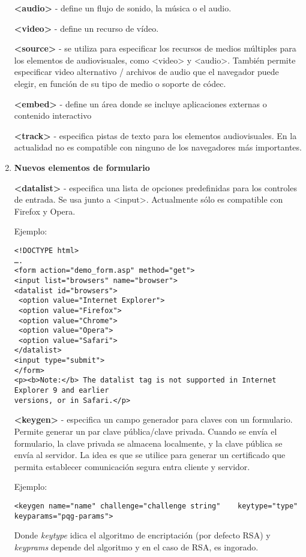 \documentclass{apuntes}
\begin{document}
\begin{enumerate}
\textbf {<audio>} - define un flujo de sonido, la música o el audio.

\textbf {<video>} - define un recurso de vídeo.

\textbf {<source>} - se utiliza para especificar los recursos de medios múltiples para los elementos de audiovisuales, como <video> y <audio>. También permite especificar video alternativo / archivos de audio que el navegador puede elegir, en función de su tipo de medio o soporte de códec.

\textbf {<embed>} - define un área donde se incluye aplicaciones externas o contenido interactivo

\textbf {<track>} - especifica pistas de texto para los elementos audiovisuales. En la actualidad no es compatible con ninguno de los navegadores más importantes.

 \item \textbf{Nuevos elementos de formulario}

 \textbf{<datalist>} - especifica una lista de opciones predefinidas para los controles de entrada. Se usa junto a <input>. Actualmente sólo es compatible con Firefox y Opera.

Ejemplo:
\begin{verbatim}
<!DOCTYPE html> 
…. 
<form action="demo_form.asp" method="get"> 
<input list="browsers" name="browser"> 
<datalist id="browsers"> 
 <option value="Internet Explorer"> 
 <option value="Firefox"> 
 <option value="Chrome"> 
 <option value="Opera"> 
 <option value="Safari"> 
</datalist> 
<input type="submit"> 
</form> 
<p><b>Note:</b> The datalist tag is not supported in Internet Explorer 9 and earlier 
versions, or in Safari.</p> 

\end{verbatim}

\textbf{<keygen>} - especifica un campo generador para claves con un formulario. Permite generar un par clave pública/clave privada. Cuando se envía el formulario, la clave privada se almacena localmente, y la clave pública se envía al servidor. La idea es que se utilice para generar un certificado que permita establecer comunicación segura  entra cliente y servidor.

Ejemplo:

\begin{verbatim}
<keygen name="name"	challenge="challenge string"	keytype="type"	keyparams="pqg-params">	
\end{verbatim}
Donde \emph{keytype} idica el algoritmo de encriptación (por defecto RSA) y \emph{keyprams} depende del algoritmo y en el caso de RSA, es ingorado.


\end{enumerate}
\end{document}
